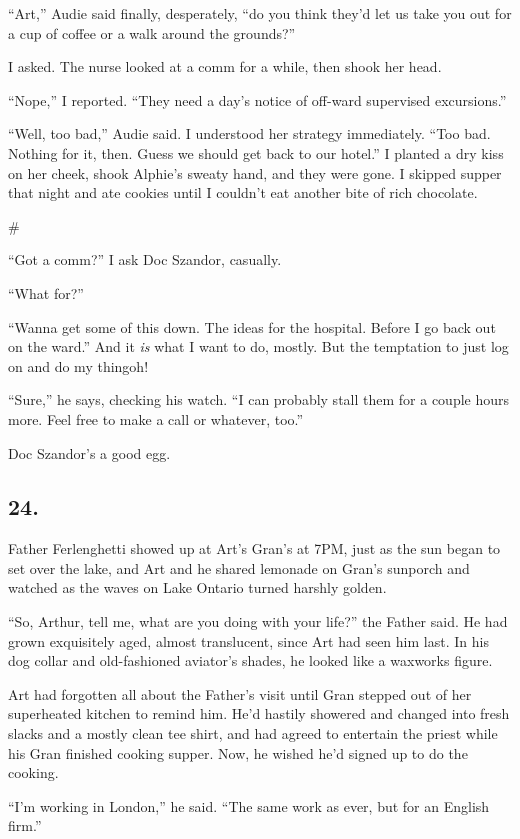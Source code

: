 “Art,” Audie said finally, desperately, “do you think they’d let us
take you out for a cup of coffee or a walk around the grounds?”

I asked. The nurse looked at a comm for a while, then shook her
head.

“Nope,” I reported. “They need a day’s notice of off-ward
supervised excursions.”

“Well, too bad,” Audie said. I understood her strategy immediately.
“Too bad. Nothing for it, then. Guess we should get back to our
hotel.” I planted a dry kiss on her cheek, shook Alphie’s sweaty
hand, and they were gone. I skipped supper that night and ate
cookies until I couldn’t eat another bite of rich chocolate.

\#

“Got a comm?” I ask Doc Szandor, casually.

“What for?”

“Wanna get some of this down. The ideas for the hospital. Before I
go back out on the ward.” And it \emph{is} what I want to do,
mostly. But the temptation to just log on and do my thing{\dash}oh!

“Sure,” he says, checking his watch. “I can probably stall them for
a couple hours more. Feel free to make a call or whatever, too.”

Doc Szandor’s a good egg.

\subsection{24.}

Father Ferlenghetti showed up at Art’s Gran’s at 7PM, just as the
sun began to set over the lake, and Art and he shared lemonade on
Gran’s sunporch and watched as the waves on Lake Ontario turned
harshly golden.

“So, Arthur, tell me, what are you doing with your life?” the
Father said. He had grown exquisitely aged, almost translucent,
since Art had seen him last. In his dog collar and old-fashioned
aviator’s shades, he looked like a waxworks figure.

Art had forgotten all about the Father’s visit until Gran stepped
out of her superheated kitchen to remind him. He’d hastily showered
and changed into fresh slacks and a mostly clean tee shirt, and had
agreed to entertain the priest while his Gran finished cooking
supper. Now, he wished he’d signed up to do the cooking.

“I’m working in London,” he said. “The same work as ever, but for
an English firm.”

